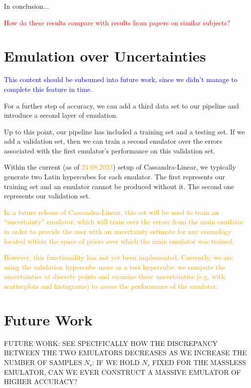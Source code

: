 In conclusion...


\textcolor{red}{How do these results compare with results from 
papers on similar subjects?}

\section{Emulation over Uncertainties}

\textcolor{blue}{This content should be subsumed into future work, since we
didn't manage to complete this feature in time.}

For a further step of accuracy, we can add a third data set to our pipeline
and introduce a second layer of emulation.

Up to this point, our pipeline has included a training set and a testing set.
If we add a validation set, then we can train a second emulator over the
errors associated with the first emulator's performance on this validation
set.

Within the current (as of \textcolor{orange}{24.08.2023}) setup of
Cassandra-Linear, we typically generate two Latin hypercubes for each
emulator. The first represents our training set and an emulator cannot be
produced without it. The second one represents our validation set.

\textcolor{orange}{In a future
release of Cassandra-Linear, this set will be used to train an ``uncertainty''
emulator, which will train over the errors from the main emulator in order to
provide the user with an uncertainty estimate for any cosmology located within
the space of priors over which the main emulator was trained.} 

\textcolor{orange}{However, this functionality has not yet been implemented. 
Currently, we are 
using the validation hypercube more as a test hypercube: we compute the 
uncertainties at discrete points and examine these uncertainties (e.g. with
scatterplots and histograms) to assess the performance of the emulator.}


\section{Future Work}
\label{sec: future_work}

FUTURE WORK: SEE SPECIFICALLY HOW THE DISCREPANCY BETWEEN THE TWO EMULATORS
DECREASES AS WE INCREASE THE NUMBER OF SAMPLES $N_s$: IF WE HOLD $N_s$ FIXED
FOR THE MASSLESS EMULATOR, CAN WE EVER CONSTRUCT A MASSIVE EMULATOR OF HIGHER
ACCURACY?


